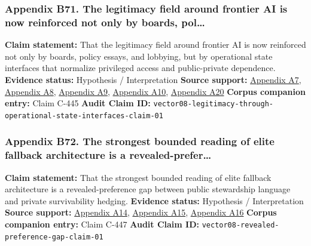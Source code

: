 \documentclass[
  american,
  11pt,
  letterpaper,
]{article}
\begin{document}
\subsubsection{Appendix B71. The legitimacy field around frontier AI is
now reinforced not only by boards,
pol\ldots{}}\label{ch-08-appendix-b71-the-legitimacy-field-around-frontier-ai-is-now-reinforced-not-only-by-boards-pol}

\textbf{Claim statement:} That the legitimacy field around frontier AI
is now reinforced not only by boards, policy essays, and lobbying, but
by operational state interfaces that normalize privileged access and
public-private dependence. \textbf{Evidence status:} Hypothesis /
Interpretation \textbf{Source support:}
\hyperref[ch-08-appendix-a7-introducing-openai-for-government]{Appendix
A7},
\hyperref[ch-08-appendix-a8-claude-gov-models-for-u-s-national-security-customers]{Appendix
A8},
\hyperref[ch-08-appendix-a9-anthropic-and-palantir-partner-to-bring-claude-ai-models-to-aws-for-u-s-government-intelligence-and-defense-operations]{Appendix
A9},
\hyperref[ch-08-appendix-a10-army-launches-detachment-201-executive-innovation-corps-to-drive-tech-transformation]{Appendix
A10},
\hyperref[ch-08-appendix-a20-openais-proposals-for-the-us-ai-action-plan]{Appendix
A20} \textbf{Corpus companion entry:} Claim C-445 \textbf{Audit Claim
ID:}
\texttt{vector08-legitimacy-through-operational-state-interfaces-claim-01}

\subsubsection{Appendix B72. The strongest bounded reading of elite
fallback architecture is a
revealed-prefer\ldots{}}\label{ch-08-appendix-b72-the-strongest-bounded-reading-of-elite-fallback-architecture-is-a-revealed-prefer}

\textbf{Claim statement:} That the strongest bounded reading of elite
fallback architecture is a revealed-preference gap between public
stewardship language and private survivability hedging. \textbf{Evidence
status:} Hypothesis / Interpretation \textbf{Source support:}
\hyperref[ch-08-appendix-a14-sam-altman-s-manifest-destiny]{Appendix
A14},
\hyperref[ch-08-appendix-a15-inside-mark-zuckerbergs-top-secret-hawaii-compound]{Appendix
A15},
\hyperref[ch-08-appendix-a16-mark-zuckerberg-downplays-his-5-000-square-foot-underground-bunker-in-hawaii-just-a-little-shelter]{Appendix
A16} \textbf{Corpus companion entry:} Claim C-447 \textbf{Audit Claim
ID:} \texttt{vector08-revealed-preference-gap-claim-01}
\end{document}
